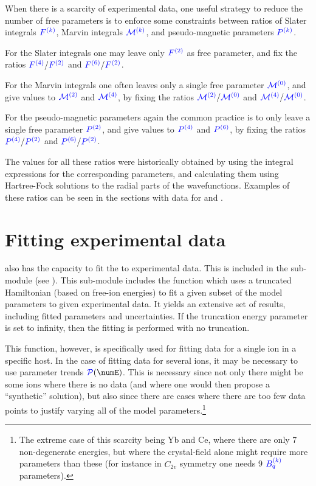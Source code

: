 \documentclass[11pt, twoside,openright]{article}
\begin{document}
When there is a scarcity of experimental data, one useful strategy to reduce the number of free parameters is to enforce some constraints between ratios of Slater integrals $\textcolor{blue}{{F^{(k)}}}$, Marvin integrals $\textcolor{blue}{\mathcal{M}^{(k)}}$, and pseudo-magnetic parameters $\textcolor{blue}{P^{(k)}}$.

 For the Slater integrals one may leave only $\textcolor{blue}{{F^{(2)}}}$ as free parameter, and fix the ratios $\textcolor{blue}{{F^{(4)}}}/\textcolor{blue}{{F^{(2)}}}$ and $\textcolor{blue}{{F^{(6)}}}/\textcolor{blue}{{F^{(2)}}}$.
 
 For the Marvin integrals one often leaves only a single free parameter $\textcolor{blue}{\mathcal{M}^{(0)}}$, and give values to $\textcolor{blue}{\mathcal{M}^{(2)}}$ and $\textcolor{blue}{\mathcal{M}^{(4)}}$, by fixing the ratios $\textcolor{blue}{\mathcal{M}^{(2)}}/\textcolor{blue}{\mathcal{M}^{(0)}}$ and $\textcolor{blue}{\mathcal{M}^{(4)}}/\textcolor{blue}{\mathcal{M}^{(0)}}$.
 
 For the pseudo-magnetic parameters again the common practice is to only leave a single free parameter $\textcolor{blue}{P^{(2)}}$, and give values to $\textcolor{blue}{P^{(4)}}$ and $\textcolor{blue}{P^{(6)}}$, by fixing the ratios $\textcolor{blue}{P^{(4)}}/\textcolor{blue}{P^{(2)}}$ and $\textcolor{blue}{P^{(6)}}/\textcolor{blue}{P^{(2)}}$.
 
 The values for all these ratios were historically obtained by using the integral expressions for the corresponding parameters, and calculating them using Hartree-Fock solutions to the radial parts of the wavefunctions. Examples of these ratios can be seen in the sections with data for \LaFthree and \liyorite.

\section{Fitting experimental data}\label{section:data-fitting}

\qlanth also has the capacity to fit the \hamilton to experimental data. This is included in the sub-module  (see ). This sub-module includes the function  which uses a truncated Hamiltonian (based on free-ion energies) to fit a given subset of the model parameters to given experimental data. It yields an extensive set of results, including fitted parameters and uncertainties. If the truncation energy parameter is set to infinity, then the fitting is performed with no truncation.  

\label{note:param-model}

This function, however, is specifically used for fitting data for a single ion in a specific host. In the case of fitting data for several ions, it may be necessary to use parameter trends $\Param(\numE)$. This is necessary since not only there might be some ions where there is no data (and where one would then propose a ``synthetic'' solution), but also since there are cases where there are too few data points to justify varying all of the model parameters.\footnote{The extreme case of this scarcity being Yb and Ce, where there are only 7 non-degenerate energies, but where the crystal-field alone might require more parameters than these (for instance in $C_{2v}$ symmetry one needs 9 $\textcolor{blue}{B^{(k)}_{q}}$ parameters).}
\end{document}
